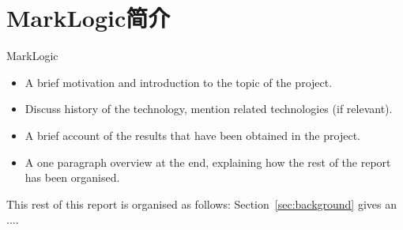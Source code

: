 \section{MarkLogic简介}
\label{sec:introduction}

MarkLogic

\begin{itemize}
  
\item A brief motivation and introduction to the topic of the project.

\item Discuss history of the technology, mention related technologies (if relevant).

\item A brief account of the results that have been obtained in the project.

\item A one paragraph overview at the end, explaining how the rest of
  the report has been organised.

\end{itemize}

\noindent
This rest of this report is organised as follows:
Section~\ref{sec:background} gives an ....


